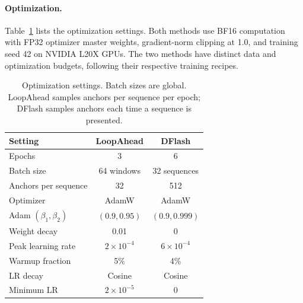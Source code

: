 \paragraph{Optimization.}
Table~\ref{tab:drafter-optimization} lists the optimization settings.
Both methods use BF16 computation with FP32 optimizer master weights,
gradient-norm clipping at 1.0, and training seed 42 on NVIDIA L20X GPUs.
The two methods have distinct data and
optimization budgets, following their respective training recipes.

\begin{table}[t]
  \centering
  \small
  \setlength{\tabcolsep}{4pt}
  \caption{Optimization settings. Batch sizes are global.
  LoopAhead samples anchors per sequence per epoch; DFlash samples
  anchors each time a sequence is presented.}
  \label{tab:drafter-optimization}
  \begin{tabular}{@{}lcc@{}}
    \toprule
    Setting & LoopAhead & DFlash \\
    \midrule
    Epochs & 3 & 6 \\
    Batch size & 64 windows & 32 sequences \\
    Anchors per sequence & 32 & 512 \\
    Optimizer & AdamW & AdamW \\
    Adam $(\beta_1,\beta_2)$ & $(0.9,0.95)$ & $(0.9,0.999)$ \\
    Weight decay & 0.01 & 0 \\
    Peak learning rate & $2\times10^{-4}$ & $6\times10^{-4}$ \\
    Warmup fraction & 5\% & 4\% \\
    LR decay & Cosine & Cosine \\
    Minimum LR & $2\times10^{-5}$ & 0 \\
    \bottomrule
  \end{tabular}
\end{table}
